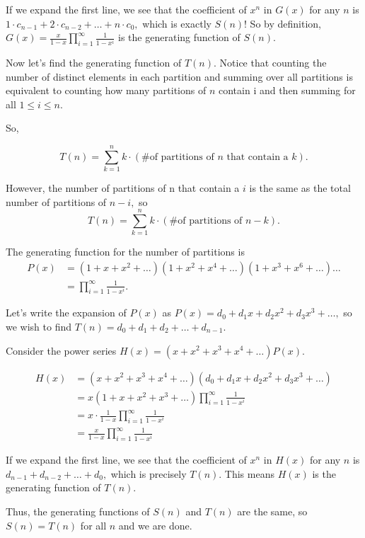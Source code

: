 \begin{enumerate}
 If we expand the first line, we see that the coefficient of $x^n$ in $G(x)$ for any $n$ is $1\cdot c_{n-1}+2\cdot c_{n-2}+\ldots+n\cdot c_0,$ which is exactly $S(n)$! So by definition, $G(x)=\frac{x}{1-x} \prod\limits_{i=1}^{\infty}\frac{1}{1-x^i}$ is the generating function of $S(n).$

 Now let's find the generating function of $T(n).$ Notice that counting the number of distinct elements in each partition and summing over all partitions is equivalent to counting how many partitions of $n$ contain i and then summing for all $1\leq i \leq n.$ 

 So, 

 
 \[T(n) = \sum_{k=1}^n k\cdot (\text{\# of partitions of }n\text{ that contain a }k).\]

 However, the number of partitions of n that contain a $i$ is the same as the total number of partitions of $n-i,$ so 
 \[T(n) = \sum_{k=1}^n k\cdot (\text{\# of partitions of }n-k).\]

 The generating function for the number of partitions is 
 \begin{align*} P(x) &= (1+x+x^2+\ldots)(1+x^2+x^4+\ldots)(1+x^3+x^6+\ldots)\ldots \\ &= \prod\limits_{i=1}^{\infty} \frac{1}{1-x^i}. \end{align*}


 Let's write the expansion of $P(x)$ as $P(x)=d_0+d_1x+d_2x^2+d_3x^3+\ldots,$ so we wish to find $T(n)=d_0+d_1+d_2+\ldots+d_{n-1}.$

 Consider the power series $H(x)=(x+x^2+x^3+x^4+\ldots)P(x).$

 \begin{align*} H(x) &= (x+x^2+x^3+x^4+\ldots)(d_0+d_1x+d_2x^2+d_3x^3+\ldots) \\ &= x(1+x+x^2+x^3+\ldots) \prod\limits_{i=1}^{\infty} \frac{1}{1-x^i}\\ &= x\cdot \frac{1}{1-x}\prod\limits_{i=1}^{\infty} \frac{1}{1-x^i}\\ &= \frac{x}{1-x} \prod\limits_{i=1}^{\infty} \frac{1}{1-x^i} \end{align*}


 If we expand the first line, we see that the coefficient of $x^n$ in $H(x)$ for any $n$ is $d_{n-1}+d_{n-2}+\ldots+d_0,$ which is precisely $T(n).$ This means $H(x)$ is the generating function of $T(n).$

 Thus, the generating functions of $S(n)$ and $T(n)$ are the same, so $S(n)=T(n)$ for all $n$ and we are done.


\end{enumerate}
